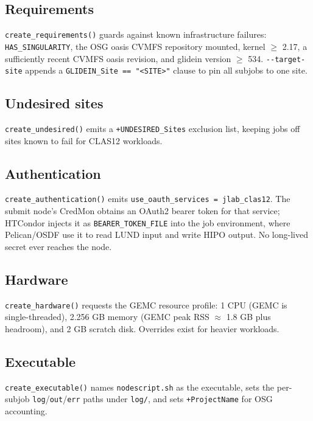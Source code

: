 \subsection{Requirements}

\texttt{create\_\allowbreak{}requirements()} guards against known infrastructure failures:
\texttt{HAS\_\allowbreak{}SINGULARITY}, the OSG oasis CVMFS repository mounted, kernel $\geq$ 2.17, a
sufficiently recent CVMFS oasis revision, and glidein version $\geq$ 534.
\texttt{-\allowbreak{}-\allowbreak{}target-\allowbreak{}site} appends a \texttt{GLIDEIN\_\allowbreak{}Site
=\allowbreak{}=\allowbreak{} "<SITE>"} clause to pin all subjobs to one site.

\subsection{Undesired sites}

\texttt{create\_\allowbreak{}undesired()} emits a \texttt{+UNDESIRED\_\allowbreak{}Sites} exclusion list,
keeping jobs off sites known to fail for CLAS12 workloads.

\subsection{Authentication}

\texttt{create\_\allowbreak{}authentication()} emits \texttt{use\_\allowbreak{}oauth\_\allowbreak{}services
=\allowbreak{} jlab\_\allowbreak{}clas12}. The submit node's CredMon obtains an OAuth2 bearer token for that
service; HTCondor injects it as \texttt{BEARER\_\allowbreak{}TOKEN\_\allowbreak{}FILE} into the job
environment, where Pelican/OSDF use it to read LUND input and write HIPO output. No long-lived secret ever
reaches the node.

\subsection{Hardware}

\texttt{create\_\allowbreak{}hardware()} requests the GEMC resource profile: 1 CPU (GEMC is single-threaded),
2.256 GB memory (GEMC peak RSS $\approx$ 1.8 GB plus headroom), and 2 GB scratch disk. Overrides exist for
heavier workloads.

\subsection{Executable}

\texttt{create\_\allowbreak{}executable()} names \texttt{nodescript.\allowbreak{}sh} as the executable, sets
the per-subjob \texttt{log}/\texttt{out}/\texttt{err} paths under \texttt{log/\allowbreak{}}, and sets
\texttt{+ProjectName} for OSG accounting.

